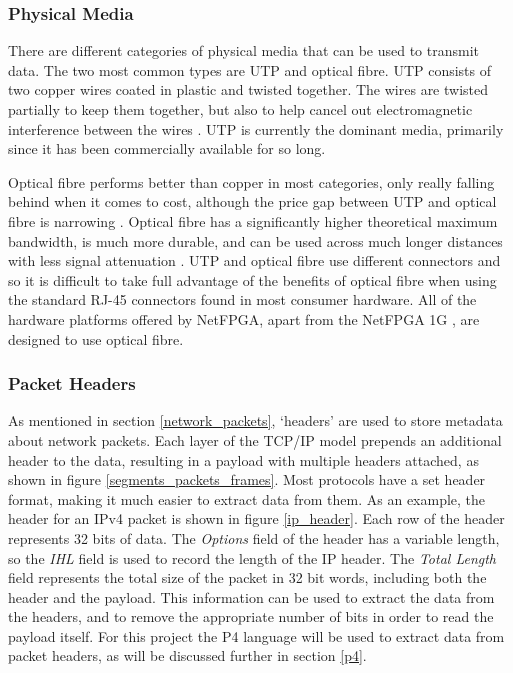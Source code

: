 \subsubsection{Physical Media}
\label{physical_media_research}
There are different categories of physical media that can be used to transmit data. The two most common types are UTP and optical fibre. UTP consists of two copper wires coated in plastic and twisted together. The wires are twisted partially to keep them together, but also to help cancel out electromagnetic interference between the wires \cite{networks03}. UTP is currently the dominant media, primarily since it has been commercially available for so long.

Optical fibre performs better than copper in most categories, only really falling behind when it comes to cost, although the price gap between UTP and optical fibre is narrowing \cite{copper_fibre_universal}. Optical fibre has a significantly higher theoretical maximum bandwidth, is much more durable, and can be used across much longer distances with less signal attenuation \cite{copper_fibre_multicom}. UTP and optical fibre use different connectors and so it is difficult to take full advantage of the benefits of optical fibre when using the standard RJ-45 connectors found in most consumer hardware. All of the hardware platforms offered by NetFPGA, apart from the NetFPGA 1G \cite{NetFPGA_1G}, are designed to use optical fibre. %


\subsubsection{Packet Headers}
As mentioned in section \ref{network_packets}, `headers' are used to store metadata about network packets.
Each layer of the TCP/IP model prepends an additional header to the data, resulting in a payload with multiple headers attached, as shown in figure \ref{segments_packets_frames}.
Most protocols have a set header format, making it much easier to extract data from them. As an example, the header for an IPv4 packet is shown in figure \ref{ip_header}. Each row of the header represents 32 bits of data.
The \textit{Options} field of the header has a variable length, so the \textit{IHL} field is used to record the length of the IP header.
The \textit{Total Length} field represents the total size of the packet in 32 bit words, including both the header and the payload.
This information can be used to extract the data from the headers, and to remove the appropriate number of bits in order to read the payload itself. For this project the P4 language \cite{P4} will be used to extract data from packet headers, as will be discussed further in section \ref{p4}.


